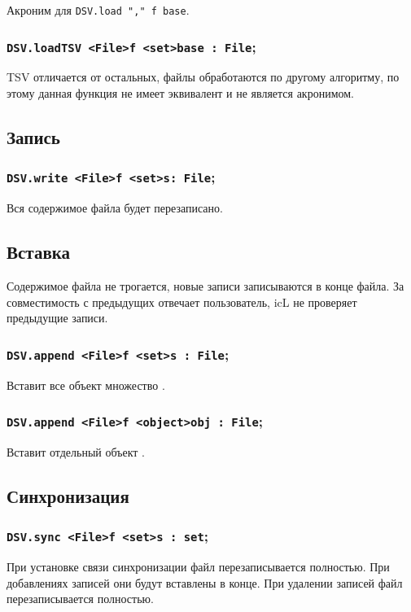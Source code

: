 Акроним для \lstinline|DSV.load "," f base|.

\subsubsection{\lstinline|DSV.loadTSV <File>f <set>base : File|;}

TSV отличается от остальных, файлы обработаются по другому алгоритму, по этому данная функция не имеет эквивалент и не является акронимом.

\subsection{Запись}

\subsubsection{\lstinline|DSV.write <File>f <set>s: File|;}

Вся содержимое файла будет перезаписано.

\subsection{Вставка}

Содержимое файла не трогается, новые записи записываются в конце файла. За совместимость с предыдущих отвечает пользователь, icL не проверяет предыдущие записи.

\subsubsection{\lstinline|DSV.append <File>f <set>s : File|;}

Вставит все объект множество .

\subsubsection{\lstinline|DSV.append <File>f <object>obj : File|;}

Вставит отдельный объект .

\subsection{Синхронизация}

\subsubsection{\lstinline|DSV.sync <File>f <set>s : set|;}

При установке связи синхронизации файл перезаписывается полностью. При добавлениях записей они будут вставлены в конце. При удалении записей файл перезаписывается полностью.

